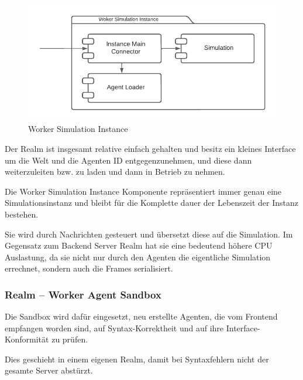 \begin{figure}[htb]
    \centering
    \includegraphics[scale=.65,center]{medien/worker-simulation-instance.pdf}
    \caption{Worker Simulation Instance}
    \ownsource
    \label{fig:worker-simulation-instance}
\end{figure}

\FloatBarrier

Der Realm ist insgesamt relative einfach gehalten und besitz ein kleines Interface um die Welt und die Agenten ID entgegenzunehmen, und diese dann weiterzuleiten bzw. zu laden und dann in Betrieb zu nehmen.

Die Worker Simulation Instance Komponente repräsentiert immer genau eine Simulationsinstanz und bleibt für die Komplette dauer der Lebenszeit der Instanz bestehen.

Sie wird durch Nachrichten gesteuert und übersetzt diese auf die Simulation.
Im Gegensatz zum Backend Server Realm hat sie eine bedeutend höhere CPU Auslastung, da sie nicht nur durch den Agenten die eigentliche Simulation errechnet, sondern auch die Frames serialisiert.

\subsubsection{Realm – Worker Agent Sandbox}

Die Sandbox wird dafür eingesetzt, neu erstellte Agenten, die vom Frontend empfangen worden sind, auf Syntax-Korrektheit und auf ihre Interface-Konformität zu prüfen.

Dies geschieht in einem eigenen Realm, damit bei Syntaxfehlern nicht der gesamte Server abstürzt.

